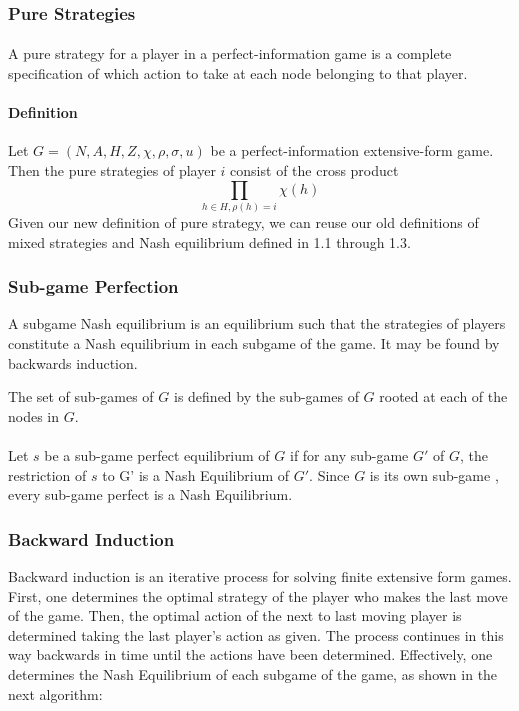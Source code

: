 \subsubsection{Pure Strategies}
\paragraph{} A pure strategy for a player in a perfect-information game is a complete specification of which action to take at each node belonging to that player.
\paragraph{Definition} Let $G = (N, A, H, Z,\chi ,\rho, \sigma, u ) $ be a perfect-information extensive-form game. Then the pure strategies of player $i$ consist of the cross product\\
\begin{equation}
\prod_{h \in H, \rho(h)=i}\chi(h)
\end{equation}
Given our new definition of pure strategy, we can reuse our old definitions of mixed strategies and Nash equilibrium defined in 1.1 through 1.3.
\subsubsection{Sub-game Perfection}
A subgame Nash equilibrium is an equilibrium such that the strategies of players constitute a Nash equilibrium in each subgame of the game. It may be found by backwards induction.
\begin{mydef}\label{def:def555}
The set of sub-games of $G$ is defined by the sub-games of $G$ rooted at each of the nodes in $G$.
\end{mydef}
\paragraph{}Let $s$ be a  sub-game perfect equilibrium of $G$ if for any sub-game $G'$ of $G$, the restriction of $s$ to G' is a Nash Equilibrium of $G'$. Since $G$ is its own sub-game , every sub-game perfect is a Nash Equilibrium.

\subsubsection{Backward Induction}
Backward induction is an iterative process for solving finite extensive form games. First, one determines the optimal strategy of the player who makes the last move of the game. Then, the optimal action of the next to last moving player is determined taking the last player's action as given. The process continues in this way backwards in time until the actions have been determined. Effectively, one determines the Nash Equilibrium of each subgame of the game, as shown in the next algorithm:

